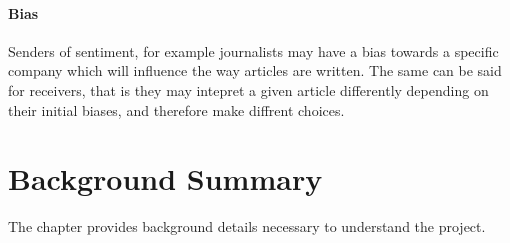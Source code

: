 \paragraph{Bias}

Senders of sentiment, for example journalists may have a bias towards a specific company which will influence the way articles are written. The same can be said for receivers, that is they may intepret a given article differently depending on their initial biases, and therefore make diffrent choices.

\section{Background Summary}

The chapter provides background details necessary to understand the project.